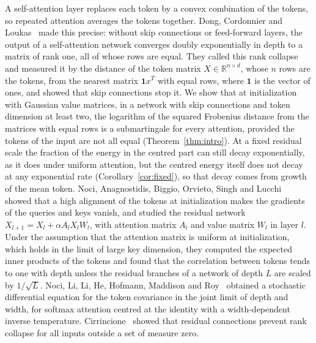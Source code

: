 \documentclass[11pt]{amsart}
\theoremstyle{definition}
\theoremstyle{remark}
\numberwithin{equation}{section}
\newcommand{\RR}{\mathbb{R}}
\begin{document}
A self-attention layer replaces each token by a convex combination of the tokens, so repeated attention averages the tokens together. Dong, Cordonnier and Loukas~\cite{DCL} made this precise: without skip connections or feed-forward layers, the output of a self-attention network converges doubly exponentially in depth to a matrix of rank one, all of whose rows are equal. They called this rank collapse and measured it by the distance of the token matrix $X\in\RR^{n\times d}$, whose $n$ rows are the tokens, from the nearest matrix $\mathbf 1x^{T}$ with equal rows, where $\mathbf 1$ is the vector of ones, and showed that skip connections stop it. We show that at initialization with Gaussian value matrices, in a network with skip connections and token dimension at least two, the logarithm of the squared Frobenius distance from the matrices with equal rows is a submartingale for every attention, provided the tokens of the input are not all equal (Theorem~\ref{thm:intro}). At a fixed residual scale the fraction of the energy in the centred part can still decay exponentially, as it does under uniform attention, but the centred energy itself does not decay at any exponential rate (Corollary~\ref{cor:fixed}), so that decay comes from growth of the mean token. Noci, Anagnostidis, Biggio, Orvieto, Singh and Lucchi~\cite{NABOSL} showed that a high alignment of the tokens at initialization makes the gradients of the queries and keys vanish, and studied the residual network $X_{l+1}=X_l+\alpha A_lX_lW_l$, with attention matrix $A_l$ and value matrix $W_l$ in layer $l$. Under the assumption that the attention matrix is uniform at initialization, which holds in the limit of large key dimension, they computed the expected inner products of the tokens and found that the correlation between tokens tends to one with depth unless the residual branches of a network of depth $L$ are scaled by $1/\sqrt L$. Noci, Li, Li, He, Hofmann, Maddison and Roy~\cite{shaped} obtained a stochastic differential equation for the token covariance in the joint limit of depth and width, for softmax attention centred at the identity with a width-dependent inverse temperature. Cirrincione~\cite{Cir} showed that residual connections prevent rank collapse for all inputs outside a set of measure zero.
\end{document}
